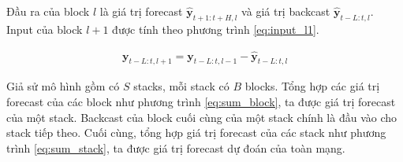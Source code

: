 \documentclass[aps,prb,groupedaddress,twocolumn,showpacs,dvipdfmx,superscriptaddress,pdftex]{revtex4-2}
\begin{document}

\vspace{2mm}

Đầu ra của block $l$ là giá trị forecast $\mathbf{\hat{y}}_{t+1:t+H, l}$ và giá trị backcast $\mathbf{\hat{y}}_{t-L:t, l}$. Input của block $l+1$ được tính theo phương trình \ref{eq:input_l1}.


\begin{align}
    \mathbf{y}_{t-L:t, l+1} = \mathbf{y}_{t-L:t, l-1} - \mathbf{\hat{y}}_{t-L:t, l}
    \label{eq:input_l1}
\end{align}

Giả sử mô hình gồm có $S$ stacks, mỗi stack có $B$ blocks. Tổng hợp các giá trị forecast của các block như phương trình \ref{eq:sum_block}, ta được giá trị forecast của một stack. Backcast của block cuối cùng của một stack chính là đầu vào cho stack tiếp theo. Cuối cùng, tổng hợp giá trị forecast của các stack như phương trình \ref{eq:sum_stack}, ta được giá trị forecast dự đoán của toàn mạng.

\end{document}
